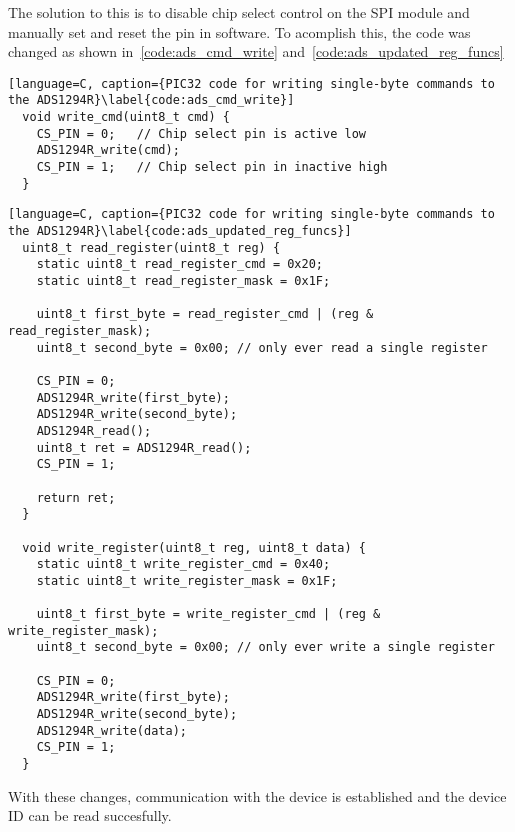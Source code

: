 The solution to this is to disable chip select control on the SPI module and manually set and reset the pin in software.
To acomplish this, the code was changed as shown in~\autoref{code:ads_cmd_write} and~\autoref{code:ads_updated_reg_funcs}

\begin{lstlisting}[language=C, caption={PIC32 code for writing single-byte commands to the ADS1294R}\label{code:ads_cmd_write}]
  void write_cmd(uint8_t cmd) {
    CS_PIN = 0;   // Chip select pin is active low
    ADS1294R_write(cmd);
    CS_PIN = 1;   // Chip select pin in inactive high
  }
\end{lstlisting}


\begin{lstlisting}[language=C, caption={PIC32 code for writing single-byte commands to the ADS1294R}\label{code:ads_updated_reg_funcs}]
  uint8_t read_register(uint8_t reg) {
    static uint8_t read_register_cmd = 0x20;
    static uint8_t read_register_mask = 0x1F;

    uint8_t first_byte = read_register_cmd | (reg & read_register_mask);
    uint8_t second_byte = 0x00; // only ever read a single register

    CS_PIN = 0;
    ADS1294R_write(first_byte);
    ADS1294R_write(second_byte);
    ADS1294R_read();
    uint8_t ret = ADS1294R_read();
    CS_PIN = 1;

    return ret;
  }

  void write_register(uint8_t reg, uint8_t data) {
    static uint8_t write_register_cmd = 0x40;
    static uint8_t write_register_mask = 0x1F;

    uint8_t first_byte = write_register_cmd | (reg & write_register_mask);
    uint8_t second_byte = 0x00; // only ever write a single register

    CS_PIN = 0;
    ADS1294R_write(first_byte);
    ADS1294R_write(second_byte);
    ADS1294R_write(data);
    CS_PIN = 1;
  }
\end{lstlisting}

With these changes, communication with the device is established and the device ID can be read succesfully.
